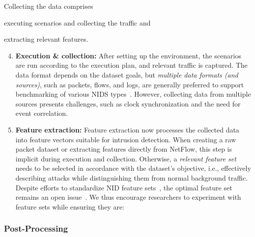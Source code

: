 Collecting the data comprises
\begin{enumerate*}[label=\alph*)]
    \item executing scenarios and collecting the traffic and
    \item extracting relevant features.
\end{enumerate*}

\begin{enumerate}[nosep, label=\textbf{\arabic*}., topsep=0pt, wide, labelindent=\parindent, itemsep=0pt, parsep=0pt]
\setcounter{enumi}{3}

\item \textbf{Execution \& collection:} After setting up the environment, the scenarios are run according to the execution plan, and relevant traffic is captured. The data format depends on the dataset goals, but \emph{multiple data formats (and sources)}, such as packets, flows, and logs, are generally preferred to support benchmarking of various NIDS types~\cite{myneni2023_unraveled}. However, collecting data from multiple sources presents challenges, such as clock synchronization and the need for event correlation.

\item \textbf{Feature extraction:} Feature extraction now processes the collected data into feature vectors suitable for intrusion detection. When creating a raw packet dataset or extracting features directly from NetFlow, this step is implicit during execution and collection. Otherwise, a \emph{relevant feature set} needs to be selected in accordance with the dataset's objective, i.e., effectively describing attacks while distinguishing them from normal background traffic. Despite efforts to standardize NID feature sets~\cite{sarhan2022_nids_feature_set}, the optimal feature set remains an open issue~\cite{sarhan2022_evaluting_ftr_sets_nids}. We thus encourage researchers to experiment with feature sets while ensuring they are:
\end{enumerate}

\subsubsection{Post-Processing}

